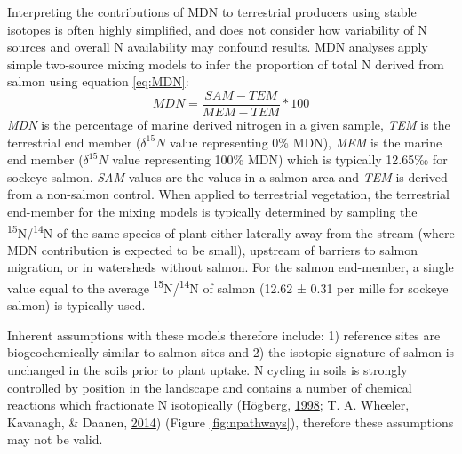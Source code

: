 \documentclass [11pt, proquest] {uwthesis}[2015/03/03]
\begin{document}
Interpreting the contributions of MDN to terrestrial producers using
stable isotopes is often highly simplified, and does not consider how
variability of N sources and overall N availability may confound
results. MDN analyses apply simple two-source mixing models to infer the
proportion of total N derived from salmon using equation \eqref{eq:MDN}:
\begin{equation} 
  MDN = \frac{SAM-TEM}{MEM-TEM}*100
  \label{eq:MDN}
\end{equation}
\emph{MDN} is the percentage of marine derived nitrogen in a given
sample, \emph{TEM} is the terrestrial end member (\(\delta^{15}N\) value
representing 0\% MDN), \emph{MEM} is the marine end member
(\(\delta^{15}N\) value representing 100\% MDN) which is typically
12.65‰ for sockeye salmon. \emph{SAM} values are the values in a salmon
area and \emph{TEM} is derived from a non-salmon control. When applied
to terrestrial vegetation, the terrestrial end-member for the mixing
models is typically determined by sampling the
\textsuperscript{15}N/\textsuperscript{14}N of the same species of plant
either laterally away from the stream (where MDN contribution is
expected to be small), upstream of barriers to salmon migration, or in
watersheds without salmon. For the salmon end-member, a single value
equal to the average \textsuperscript{15}N/\textsuperscript{14}N of
salmon (12.62 ± 0.31 per mille for sockeye salmon) is typically used.

Inherent assumptions with these models therefore include: 1) reference
sites are biogeochemically similar to salmon sites and 2) the isotopic
signature of salmon is unchanged in the soils prior to plant uptake. N
cycling in soils is strongly controlled by position in the landscape and
contains a number of chemical reactions which fractionate N isotopically
(Högberg, \protect\hyperlink{ref-Hogberg1998}{1998}; T. A. Wheeler,
Kavanagh, \& Daanen, \protect\hyperlink{ref-Wheeler2014}{2014}) (Figure
\ref{fig:npathways}), therefore these assumptions may not be valid.
\end{document}
